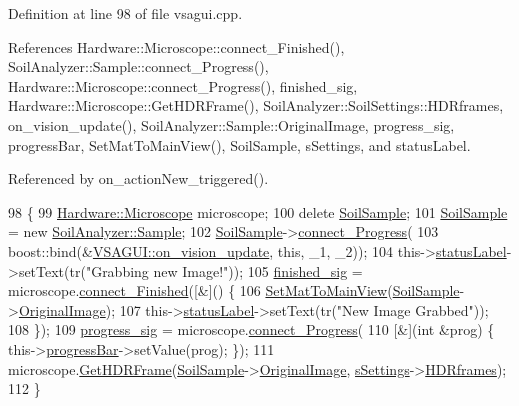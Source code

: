 Definition at line 98 of file vsagui.\+cpp.



References Hardware\+::\+Microscope\+::connect\+\_\+\+Finished(), Soil\+Analyzer\+::\+Sample\+::connect\+\_\+\+Progress(), Hardware\+::\+Microscope\+::connect\+\_\+\+Progress(), finished\+\_\+sig, Hardware\+::\+Microscope\+::\+Get\+H\+D\+R\+Frame(), Soil\+Analyzer\+::\+Soil\+Settings\+::\+H\+D\+Rframes, on\+\_\+vision\+\_\+update(), Soil\+Analyzer\+::\+Sample\+::\+Original\+Image, progress\+\_\+sig, progress\+Bar, Set\+Mat\+To\+Main\+View(), Soil\+Sample, s\+Settings, and status\+Label.



Referenced by on\+\_\+action\+New\+\_\+triggered().


\begin{DoxyCode}
98                                        \{
99   \hyperlink{class_hardware_1_1_microscope}{Hardware::Microscope} microscope;
100   \textcolor{keyword}{delete} \hyperlink{class_v_s_a_g_u_i_ac90517c9baea0a75455d43d5eb77d3e7}{SoilSample};
101   \hyperlink{class_v_s_a_g_u_i_ac90517c9baea0a75455d43d5eb77d3e7}{SoilSample} = \textcolor{keyword}{new} \hyperlink{class_soil_analyzer_1_1_sample}{SoilAnalyzer::Sample};
102   \hyperlink{class_v_s_a_g_u_i_ac90517c9baea0a75455d43d5eb77d3e7}{SoilSample}->\hyperlink{class_soil_analyzer_1_1_sample_a472dfdde346375463c979e45eb75fbb7}{connect\_Progress}(
103       boost::bind(&\hyperlink{class_v_s_a_g_u_i_a8a5092f741e17c73b04850a6b30dda04}{VSAGUI::on\_vision\_update}, \textcolor{keyword}{this}, \_1, \_2));
104   this->\hyperlink{class_v_s_a_g_u_i_a8cbaaa3b5e0975b7a1101b9bef3c9b57}{statusLabel}->setText(tr(\textcolor{stringliteral}{"Grabbing new Image!"}));
105   \hyperlink{class_v_s_a_g_u_i_a670325c6bab3874937f0a9b7e8e3b370}{finished\_sig} = microscope.\hyperlink{class_hardware_1_1_microscope_abc3f008ec7cf00e6ddf31b0a4ed392cb}{connect\_Finished}([&]() \{
106     \hyperlink{class_v_s_a_g_u_i_a988508cf880e27fcd8a029b94e546bcc}{SetMatToMainView}(\hyperlink{class_v_s_a_g_u_i_ac90517c9baea0a75455d43d5eb77d3e7}{SoilSample}->\hyperlink{class_soil_analyzer_1_1_sample_a0d6e6fca9e232a77329daf0b4b29c634}{OriginalImage});
107     this->\hyperlink{class_v_s_a_g_u_i_a8cbaaa3b5e0975b7a1101b9bef3c9b57}{statusLabel}->setText(tr(\textcolor{stringliteral}{"New Image Grabbed"}));
108   \});
109   \hyperlink{class_v_s_a_g_u_i_a3503e0415ff202c93fc4d7ee5c6f4fb8}{progress\_sig} = microscope.\hyperlink{class_hardware_1_1_microscope_abc29f83a2f0ba536df3eb7ccc250b111}{connect\_Progress}(
110       [&](\textcolor{keywordtype}{int} &prog) \{ this->\hyperlink{class_v_s_a_g_u_i_a17b71e08eeff21b28e3816ec5482473c}{progressBar}->setValue(prog); \});
111   microscope.\hyperlink{class_hardware_1_1_microscope_a8cec2eacbd3f0ea164d16100a6078d5b}{GetHDRFrame}(\hyperlink{class_v_s_a_g_u_i_ac90517c9baea0a75455d43d5eb77d3e7}{SoilSample}->\hyperlink{class_soil_analyzer_1_1_sample_a0d6e6fca9e232a77329daf0b4b29c634}{OriginalImage}, 
      \hyperlink{class_v_s_a_g_u_i_a4a0358d00aa3cb520a9a1321962b0d4d}{sSettings}->\hyperlink{class_soil_analyzer_1_1_soil_settings_a77e631ff44efe74762b5adaa2eb2cd11}{HDRframes});
112 \}
\end{DoxyCode}



